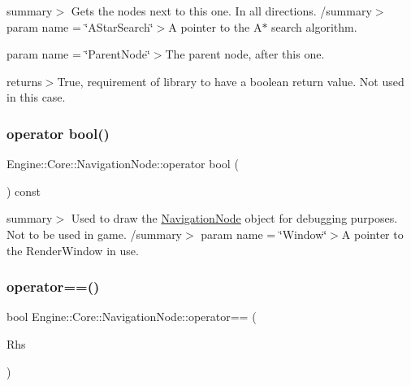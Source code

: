 summary$>$ Gets the nodes next to this one. In all directions. /summary$>$ param name = \char`\"{}\+A\+Star\+Search\char`\"{}$>$A pointer to the A$\ast$ search algorithm.

param name = \char`\"{}\+Parent\+Node\char`\"{}$>$The parent node, after this one.

returns$>$True, requirement of library to have a boolean return value. Not used in this case.\mbox{\label{struct_engine_1_1_core_1_1_navigation_node_a6435f925c6b28774a025f5650bd76b56}} 
\subsubsection{\texorpdfstring{operator bool()}{operator bool()}}
{\footnotesize\ttfamily Engine\+::\+Core\+::\+Navigation\+Node\+::operator bool (\begin{DoxyParamCaption}{ }\end{DoxyParamCaption}) const\hspace{0.3cm}{\ttfamily [explicit]}}

summary$>$ Used to draw the \hyperlink{struct_engine_1_1_core_1_1_navigation_node}{Navigation\+Node} object for debugging purposes. Not to be used in game. /summary$>$ param name = \char`\"{}\+Window\char`\"{}$>$A pointer to the Render\+Window in use.\mbox{\label{struct_engine_1_1_core_1_1_navigation_node_a12cffe89f89aac9623ae2530dd556dc7}} 
\subsubsection{\texorpdfstring{operator==()}{operator==()}\hspace{0.1cm}{\footnotesize\ttfamily [1/2]}}
{\footnotesize\ttfamily bool Engine\+::\+Core\+::\+Navigation\+Node\+::operator== (\begin{DoxyParamCaption}\item[{const \hyperlink{struct_engine_1_1_core_1_1_navigation_node}{Navigation\+Node} \&}]{Rhs }\end{DoxyParamCaption})}

